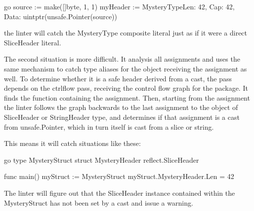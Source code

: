         go
        source := make([]byte, 1, 1)
        myHeader := MysteryTypeLen: 42, Cap: 42, Data: uintptr(unsafe.Pointer(source))


        the linter will catch the MysteryType composite literal just as if it were a direct SliceHeader literal.

        The second situation is more difficult. It analysis all assignments and uses the same mechanism to catch type aliases
        for the object receiving the assignment as well. To determine whether it is a safe header derived from a cast, the pass
        depends on the ctrlflow pass, receiving the control flow graph for the package. It finds the function containing the
        assignment. Then, starting from the assignment the linter follows the graph backwards to the last assignment to the
        object of SliceHeader or StringHeader type, and determines if that assignment is a cast from unsafe.Pointer, which
        in turn itself is cast from a slice or string.

        This means it will catch situations like these:

        go
        type MysteryStruct struct
        MysteryHeader reflect.SliceHeader


        func main()
        myStruct := MysteryStruct
        myStruct.MysteryHeader.Len = 42



        The linter will figure out that the SliceHeader instance contained within the MysteryStruct has not been set by a
        cast and issue a warning.



